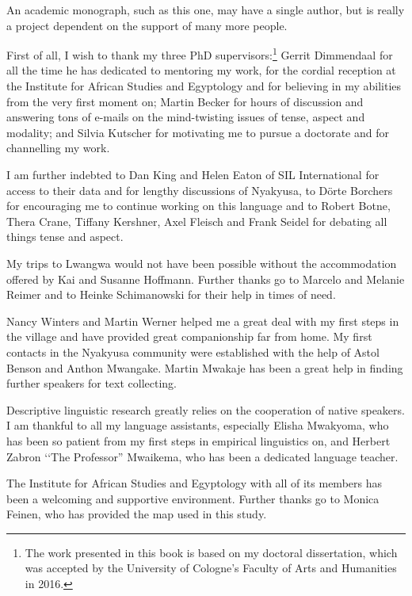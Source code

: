 \begin{refsection}
An academic monograph, such as this one, may have a single author, but is really a project dependent on the support of many more people.

First of all, I wish to thank my three PhD supervisors:\footnote{The work presented in this book is based on my doctoral dissertation, which was accepted by the University of Cologne's Faculty of Arts and Humanities in 2016.} Gerrit Dimmendaal for all the time he has dedicated to mentoring my work, for the cordial reception at the Institute for African Studies and Egyptology and for believing in my abilities from the very first moment on; Martin Becker for hours of discussion and answering tons of e-mails on the mind-twisting issues of tense, aspect and modality; and Silvia Kutscher for motivating me to pursue a doctorate and for channelling my work.

I am further indebted to Dan King and Helen Eaton of SIL International for access to their data and for lengthy discussions of Nyakyusa, to Dörte Borchers for encouraging me to continue working on this language and to Robert Botne, Thera Crane, Tiffany Kershner, Axel Fleisch and Frank Seidel for debating all things tense and aspect.

My trips to Lwangwa would not have been possible without the accommodation offered by Kai and Susanne Hoffmann. Further thanks go to Marcelo and Melanie Reimer and to Heinke Schimanowski for their help in times of need.

Nancy Winters and Martin Werner helped me a great deal with my first steps in the village and have provided great companionship far from home. My first contacts in the Nyakyusa community were established with the help of Astol Benson and Anthon Mwangake. Martin Mwakaje has been a great help in finding further speakers for text collecting.

Descriptive linguistic research greatly relies on the cooperation of native speakers. I am thankful to all my language assistants, especially Elisha Mwakyoma, who has been so patient from my first steps in empirical linguistics on, and Herbert Zabron \lq\lq The Professor'' Mwaikema, who has been a dedicated language teacher.

\largerpage
The Institute for African Studies and Egyptology with all of its members has been a welcoming and supportive environment. Further thanks go to Monica Feinen, who has provided the map used in this study.


\end{refsection}
